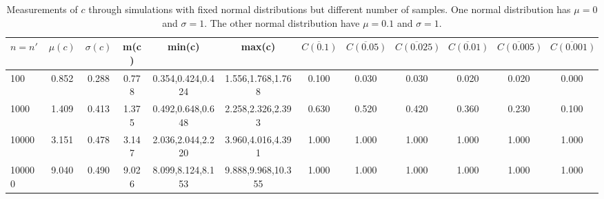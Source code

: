 \begin{table*}[h!]
\begin{center}
\begin{tabular}{| l | c | c | c | c | c | c | c | c | c | c | c |}\hline
$n=n'$ & $\mu(c)$ & $\sigma(c)$ & m(c) & min(c) & max(c) & $\overline{C(0.1)}$ & $\overline{C(0.05)}$ & $\overline{C(0.025)}$ & $\overline{C(0.01)}$ & $\overline{C(0.005)}$ & $\overline{C(0.001)}$ \\\hline
100 & 0.852 & 0.288 & 0.778 & 0.354,0.424,0.424 & 1.556,1.768,1.768  & 0.100  & 0.030  & 0.030  & 0.020  & 0.020  & 0.000 \\\hline
1000 & 1.409 & 0.413 & 1.375 & 0.492,0.648,0.648 & 2.258,2.326,2.393  & 0.630  & 0.520  & 0.420  & 0.360  & 0.230  & 0.100 \\\hline
10000 & 3.151 & 0.478 & 3.147 & 2.036,2.044,2.220 & 3.960,4.016,4.391  & 1.000  & 1.000  & 1.000  & 1.000  & 1.000  & 1.000 \\\hline
100000 & 9.040 & 0.490 & 9.026 & 8.099,8.124,8.153 & 9.888,9.968,10.355  & 1.000  & 1.000  & 1.000  & 1.000  & 1.000  & 1.000 \\\hline
\end{tabular}
\caption{Measurements of $c$ through simulations
        with fixed normal distributions but different number of samples.
        One normal distribution has $\mu=0$ and $\sigma=1$.
        The other normal distribution have $\mu=0.1$ and $\sigma=1$.}
\end{center}
\end{table*}